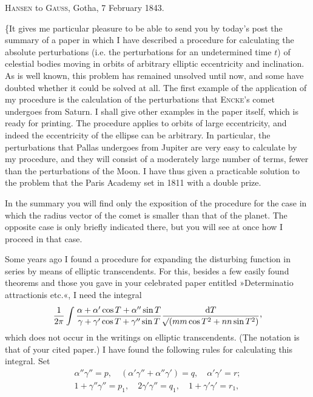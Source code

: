 \par{}\bigskip
\begin{center}
\textsc{Hansen} to \textsc{Gauss}, Gotha, 7 February 1843.
\end{center}
\noindent\hspace*{\parindent}\{It gives me particular pleasure to be able to send you by today's post the summary of a paper in which I have described a procedure for calculating the absolute perturbations (i.e. the perturbations for an undetermined time \(t\)) of celestial bodies moving in orbits of arbitrary elliptic eccentricity and inclination. As is well known, this problem has remained unsolved until now, and some have doubted whether it could be solved at all. The first example of the application of my procedure is the calculation of the perturbations that \textsc{Encke}'s comet undergoes from Saturn. I shall give other examples in the paper itself, which is ready for printing. The procedure applies to orbits of large eccentricity, and indeed the eccentricity of the ellipse can be arbitrary. In particular, the perturbations that Pallas undergoes from Jupiter are very easy to calculate by my procedure, and they will consist of a moderately large number of terms, fewer than the perturbations of the Moon. I have thus given a practicable solution to the problem that the Paris Academy set in 1811 with a double prize.
\par{}In the summary you will find only the exposition of the procedure for the case in which the radius vector of the comet is smaller than that of the planet. The opposite case is only briefly indicated there, but you will see at once how I proceed in that case.
\par Some years ago I found a procedure for expanding the disturbing function in series by means of elliptic transcendents. For this, besides a few easily found theorems and those you gave in your celebrated paper entitled »Determinatio attractionis etc.«, I need the integral
\[
\frac{1}{2\pi}\int\frac{\alpha+\alpha'\cos T+\alpha''\sin T}{\gamma+\gamma'\cos T+\gamma''\sin T}\frac{\mathrm{d}T}{\BareRoot{(mm\cos T^2+nn\sin T^2)}}\mathpunct{\raisebox{.45ex}{,}}
\]
which does not occur in the writings on elliptic transcendents. (The notation is that of your cited paper.) I have found the following rules for calculating this integral. Set
\[
\begin{gathered}
\alpha''\gamma''=p,\quad(\alpha'\gamma''+\alpha''\gamma')=q,\quad\alpha'\gamma'=r;\\
1+\gamma''\gamma''=p_1,\quad2\gamma'\gamma''=q_1,\quad1+\gamma'\gamma'=r_1,
\end{gathered}
\]

